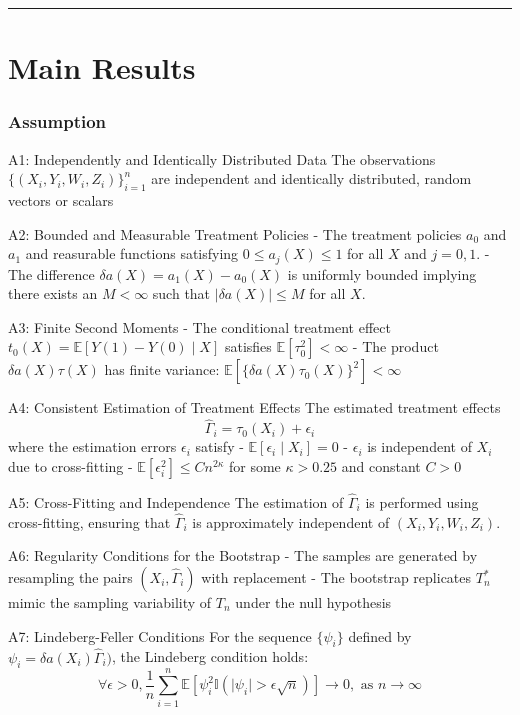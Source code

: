 \documentclass[
]{article}
\begin{document}
\begin{center}\rule{0.5\linewidth}{0.5pt}\end{center}

\section{Main Results}\label{main-results}

\subsubsection{Assumption}\label{assumption}

A1: Independently and Identically Distributed Data The observations
\(\{ (X_{i}, Y_{i}, W_{i}, Z_{i}) \}_{i=1}^n\) are independent and
identically distributed, random vectors or scalars

A2: Bounded and Measurable Treatment Policies - The treatment policies
\(a_{0}\) and \(a_{1}\) and reasurable functions satisfying
\(0 \leq a_{j}(X) \leq 1\) for all \(X\) and \(j = 0, 1\). - The
difference \(\delta {a}(X) = a_{1}(X) - a_{0}(X)\) is uniformly bounded
implying there exists an \(M < \infty\) such that
\(\mid \delta a(X) \mid \leq M\) for all \(X\).

A3: Finite Second Moments - The conditional treatment effect
\(t_{0}(X) = \mathbb{E}[Y(1) - Y(0) \mid X]\) satisfies
\(\mathbb{E}[\tau_{0}^2] < \infty\) - The product \(\delta a(X)\tau(X)\)
has finite variance:
\(\mathbb{E}[\{ \delta a(X) \tau_{0}(X)\}^2] < \infty\)

A4: Consistent Estimation of Treatment Effects The estimated treatment
effects \[\hat{\Gamma}_{i} = \tau_{0}(X_{i}) + \epsilon _{i}\] where the
estimation errors \(\epsilon _{i}\) satisfy -
\(\mathbb{E}[\epsilon _{i} \mid X_{i}] = 0\) - \(\epsilon _{i}\) is
independent of \(X_{i}\) due to cross-fitting -
\(\mathbb{E}[\epsilon^2_{i}] \leq Cn^{2\kappa}\) for some
\(\kappa > 0.25\) and constant \(C > 0\)

A5: Cross-Fitting and Independence The estimation of
\(\hat{\Gamma}_{i}\) is performed using cross-fitting, ensuring that
\(\hat{\Gamma}_{i}\) is approximately independent of
\((X_{i}, Y_{i}, W_{i}, Z_{i})\).

A6: Regularity Conditions for the Bootstrap - The samples are generated
by resampling the pairs \((X_{i}, \hat{\Gamma}_{i})\) with replacement -
The bootstrap replicates \(T^*_{n}\) mimic the sampling variability of
\(T_{n}\) under the null hypothesis

A7: Lindeberg-Feller Conditions For the sequence \(\{ \psi _{i} \}\)
defined by \(\psi _{i} = \delta a(X_{i})\hat{\Gamma}_{i})\), the
Lindeberg condition holds: \[
\forall \epsilon>0, \frac{1}{n}\sum_{i=1}^n \mathbb{E}[\psi _{i}^2 \mathbb{I}(\mid\psi _{i}\mid > \epsilon \sqrt{ n })] \to 0, \text{   as } n\to \infty
\]
\end{document}
